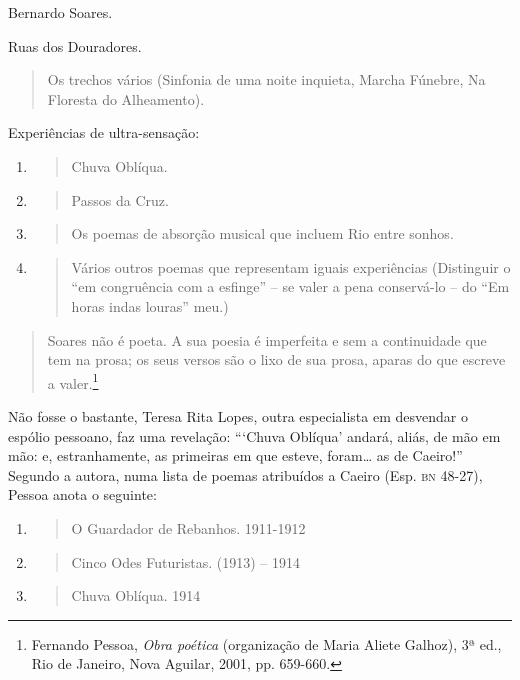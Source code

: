 Bernardo Soares.

Ruas dos Douradores.

\begin{quote}
Os trechos vários (Sinfonia de uma noite inquieta, Marcha Fúnebre, Na
Floresta do Alheamento).
\end{quote}

Experiências de ultra-sensação:

\begin{enumerate}
\def\labelenumi{\arabic{enumi}.}
\item
  \begin{quote}
  Chuva Oblíqua.
  \end{quote}
\item
  \begin{quote}
  Passos da Cruz.
  \end{quote}
\item
  \begin{quote}
  Os poemas de absorção musical que incluem Rio entre sonhos.
  \end{quote}
\item
  \begin{quote}
  Vários outros poemas que representam iguais experiências (Distinguir o
  ``em congruência com a esfinge'' -- se valer a pena conservá-lo -- do
  ``Em horas indas louras'' meu.)
  \end{quote}
\end{enumerate}

\begin{quote}
Soares não é poeta. A sua poesia é imperfeita e sem a continuidade que
tem na prosa; os seus versos são o lixo de sua prosa, aparas do que
escreve a valer.\footnote{Fernando Pessoa, \emph{Obra poética}
  (organização de Maria Aliete Galhoz), 3ª ed., Rio de Janeiro, Nova
  Aguilar, 2001, pp. 659-660.}
\end{quote}

Não fosse o bastante, Teresa Rita Lopes, outra especialista em desvendar
o espólio pessoano, faz uma revelação: ```Chuva Oblíqua' andará, aliás,
de mão em mão: e, estranhamente, as primeiras em que esteve, foram\ldots{} as
de Caeiro!'' Segundo a autora, numa lista de poemas atribuídos a Caeiro
(Esp. \textsc{bn} 48-27), Pessoa anota o seguinte:

\begin{enumerate}
\def\labelenumi{\arabic{enumi}.}
\item
  \begin{quote}
  O Guardador de Rebanhos. 1911-1912
  \end{quote}
\item
  \begin{quote}
  Cinco Odes Futuristas. (1913) -- 1914
  \end{quote}
\item
  \begin{quote}
  Chuva Oblíqua. 1914
  \end{quote}
\end{enumerate}

